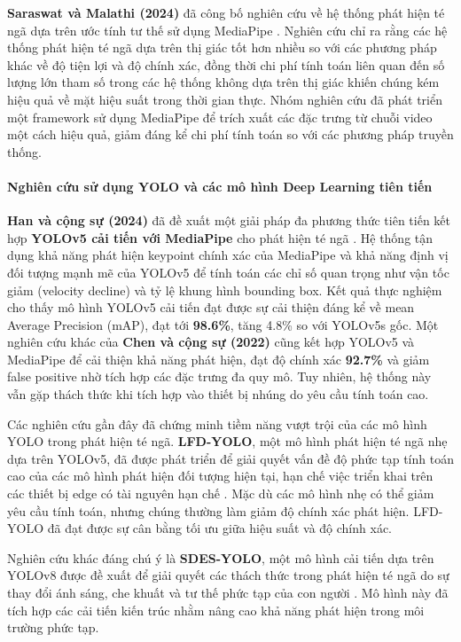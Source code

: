 \textbf{Saraswat và Malathi (2024)} đã công bố nghiên cứu về hệ thống phát hiện té ngã dựa trên ước tính tư thế sử dụng MediaPipe \cite{saraswat2024}. Nghiên cứu chỉ ra rằng các hệ thống phát hiện té ngã dựa trên thị giác tốt hơn nhiều so với các phương pháp khác về độ tiện lợi và độ chính xác, đồng thời chi phí tính toán liên quan đến số lượng lớn tham số trong các hệ thống không dựa trên thị giác khiến chúng kém hiệu quả về mặt hiệu suất trong thời gian thực. Nhóm nghiên cứu đã phát triển một framework sử dụng MediaPipe để trích xuất các đặc trưng từ chuỗi video một cách hiệu quả, giảm đáng kể chi phí tính toán so với các phương pháp truyền thống.

\paragraph{Nghiên cứu sử dụng YOLO và các mô hình Deep Learning tiên tiến}
\textbf{Han và cộng sự (2024)} đã đề xuất một giải pháp đa phương thức tiên tiến kết hợp \textbf{YOLOv5 cải tiến với MediaPipe} cho phát hiện té ngã \cite{han2024}. Hệ thống tận dụng khả năng phát hiện keypoint chính xác của MediaPipe và khả năng định vị đối tượng mạnh mẽ của YOLOv5 để tính toán các chỉ số quan trọng như vận tốc giảm (velocity decline) và tỷ lệ khung hình bounding box. Kết quả thực nghiệm cho thấy mô hình YOLOv5 cải tiến đạt được sự cải thiện đáng kể về mean Average Precision (mAP), đạt tới \textbf{98.6\%}, tăng 4.8\% so với YOLOv5s gốc. Một nghiên cứu khác của \textbf{Chen và cộng sự (2022)} cũng kết hợp YOLOv5 và MediaPipe để cải thiện khả năng phát hiện, đạt độ chính xác \textbf{92.7\%} và giảm false positive nhờ tích hợp các đặc trưng đa quy mô. Tuy nhiên, hệ thống này vẫn gặp thách thức khi tích hợp vào thiết bị nhúng do yêu cầu tính toán cao.

Các nghiên cứu gần đây đã chứng minh tiềm năng vượt trội của các mô hình YOLO trong phát hiện té ngã. \textbf{LFD-YOLO}, một mô hình phát hiện té ngã nhẹ dựa trên YOLOv5, đã được phát triển để giải quyết vấn đề độ phức tạp tính toán cao của các mô hình phát hiện đối tượng hiện tại, hạn chế việc triển khai trên các thiết bị edge có tài nguyên hạn chế \cite{lfdyolo2025}. Mặc dù các mô hình nhẹ có thể giảm yêu cầu tính toán, nhưng chúng thường làm giảm độ chính xác phát hiện. LFD-YOLO đã đạt được sự cân bằng tối ưu giữa hiệu suất và độ chính xác.

Nghiên cứu khác đáng chú ý là \textbf{SDES-YOLO}, một mô hình cải tiến dựa trên YOLOv8 được đề xuất để giải quyết các thách thức trong phát hiện té ngã do sự thay đổi ánh sáng, che khuất và tư thế phức tạp của con người \cite{sdesyolo2025}. Mô hình này đã tích hợp các cải tiến kiến trúc nhằm nâng cao khả năng phát hiện trong môi trường phức tạp.

